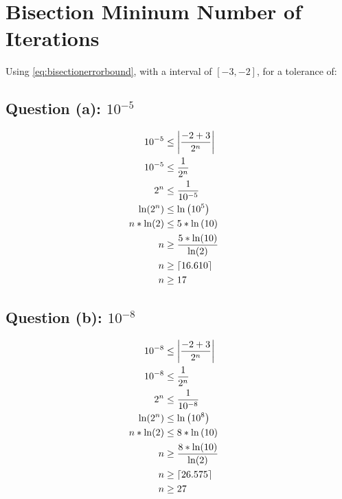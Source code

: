 \section{Bisection Mininum Number of Iterations}

Using \cref{eq:bisectionerrorbound}, with a interval of $[-3,-2]$, for a tolerance of:

\subsection{Question (a): $10^{-5}$}
	
	\begin{align}
		10^{-5} &\le \left|\frac{-2 + 3}{2^{n}}\right|& \notag \\
		10^{-5} &\le \frac{1}{2^{n}}& \notag \\
		2^{n} &\le \frac{1}{10^{-5}}& \notag \\
		\ln(2^{n}) &\le \ln\left(10^{5}\right)& \notag \\
		n*\ln(2) &\le 5*\ln\left(10\right)& \notag \\
		n &\ge \frac{5*\ln(10)}{\ln(2)}& \notag \\
		n &\ge \lceil 16.610 \rceil& \notag \\
		n &\ge 17&
	\label{eq:37a}
	\end{align}
	

\subsection{Question (b): $10^{-8}$}

	\begin{align}
		10^{-8} &\le \left|\frac{-2 + 3}{2^{n}}\right|& \notag \\
		10^{-8} &\le \frac{1}{2^{n}}& \notag \\
		2^{n} &\le \frac{1}{10^{-8}}& \notag \\
		\ln(2^{n}) &\le \ln\left(10^{8}\right)& \notag \\
		n*\ln(2) &\le 8*\ln\left(10\right)& \notag \\
		n &\ge \frac{8*\ln(10)}{\ln(2)}& \notag \\
		n &\ge \lceil 26.575 \rceil& \notag \\
		n &\ge 27&
	\label{eq:37a}
	\end{align}
